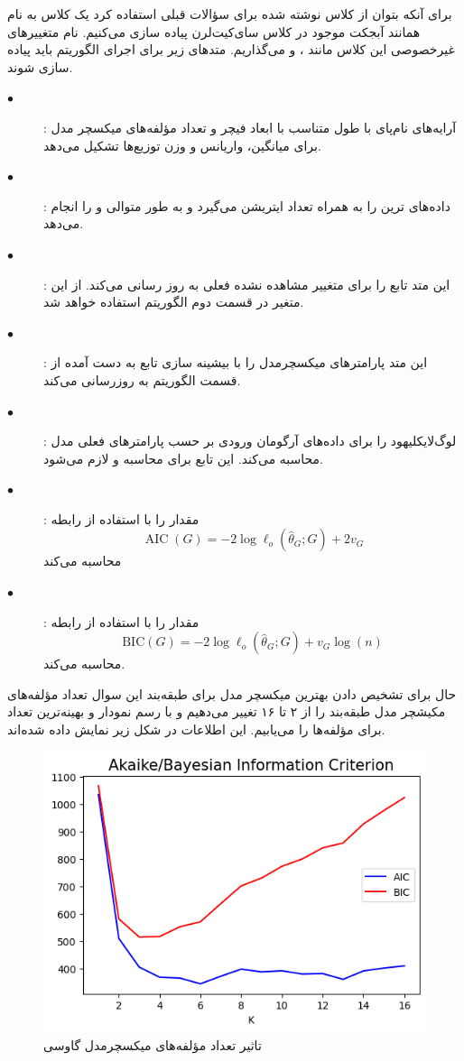 \documentclass[12pt,onecolumn,a4paper]{article}
\begin{document}
برای آنکه بتوان از کلاس  نوشته شده برای سؤالات قبلی استفاده کرد یک کلاس به نام  همانند آبجکت موجود در کلاس سای‌کیت‌لرن پیاده سازی می‌کنیم. نام متغییرهای غیرخصوصی این کلاس مانند ،  و  می‌گذاریم. متدهای زیر برای اجرای الگوریتم  باید پیاده سازی شوند.
\begin{description}
    \item[$\bullet$] : آرایه‌های نام‌پای با طول متناسب با ابعاد فیچر و تعداد مؤلفه‌های میکسچر مدل برای میانگین، واریانس و وزن توزیع‌ها تشکیل می‌دهد.
    \item[$\bullet$] : داده‌های ترین را به همراه تعداد ایتریشن می‌گیرد و به طور متوالی  و  را انجام می‌دهد.
    \item[$\bullet$] : این متد تابع  را برای متغییر مشاهده نشده فعلی  به روز رسانی می‌کند. از این متغیر در قسمت دوم الگوریتم استفاده خواهد شد.
    \item[$\bullet$] : این متد پارامترهای میکسچرمدل را با بیشینه سازی تابع  به دست آمده از قسمت الگوریتم به روزرسانی می‌کند.
    \item[$\bullet$] : لوگ‌لایکلیهود را برای داده‌های آرگومان ورودی بر حسب پارامترهای فعلی مدل محاسبه می‌کند. این تابع برای محاسبه  و  لازم می‌شود.
    \item[$\bullet$] : مقدار  را با استفاده از رابطه $$\operatorname{AIC}(G)=-2 \log \ell_{o}\left(\hat{\theta}_{G} ; G\right)+2 v_{G}$$ محاسبه می‌کند
    \item[$\bullet$] : مقدار  را با استفاده از رابطه $$\mathrm{BIC}(G)=-2 \log \ell_{o}\left(\hat{\theta}_{G} ; G\right)+v_{G} \log (n)$$ محاسبه می‌کند.
\end{description}
حال برای تشخیص دادن بهترین میکسچر مدل برای طبقه‌بند این سوال تعداد مؤلفه‌های مکیشچر مدل طبقه‌بند را از ۲ تا ۱۶ تغییر می‌دهیم و با رسم نمودار  و  بهینه‌ترین تعداد برای مؤلفه‌ها را می‌یابیم. این اطلاعات در شکل زیر نمایش داده شده‌اند.
\begin{figure}[h!]
    \label{fig:5}
    \begin{center}
    \includegraphics[scale=0.6]{q10_aicbic.png}
    \caption{تاثیر تعداد مؤلفه‌های میکسچرمدل گاوسی}
    \end{center}
\end{figure}
\end{document}
